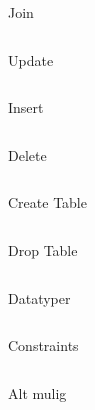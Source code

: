 \begin{frame}[fragile]{Join}
\begin{verbatim}

\end{verbatim}
\end{frame}

\begin{frame}[fragile]{Update}
\begin{verbatim}

\end{verbatim}
\end{frame}

\begin{frame}[fragile]{Insert}
\begin{verbatim}

\end{verbatim}
\end{frame}

\begin{frame}[fragile]{Delete}
\begin{verbatim}

\end{verbatim}
\end{frame}

\begin{frame}[fragile]{Create Table}
\begin{verbatim}

\end{verbatim}
\end{frame}

\begin{frame}[fragile]{Drop Table}
\begin{verbatim}

\end{verbatim}
\end{frame}

\begin{frame}[fragile]{Datatyper}
\begin{verbatim}

\end{verbatim}
\end{frame}

\begin{frame}[fragile]{Constraints}
\begin{verbatim}

\end{verbatim}
\end{frame}

\begin{frame}[fragile]{Alt mulig}
\begin{verbatim}

\end{verbatim}
\end{frame}

